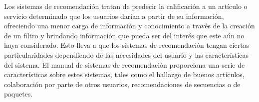 \documentclass[12pt,letterpaper,openany]{book}
\begin{document}
\vspace{5mm}\newline
Los sistemas de recomendación tratan de predecir la calificación a un artículo o servicio determinado que los usuarios darían a partir de su información, ofreciendo una menor carga de información y conocimiento a través de la creación de un filtro y brindando información que pueda ser del interés que este aún no haya considerado\cite{6}. Esto lleva a que los sistemas de recomendación tengan ciertas particularidades dependiendo de las necesidades del usuario y las características del sistema. El manual de sistemas de recomendación\cite{13} proporciona una serie de características sobre estos sistemas, tales como el hallazgo de buenos artículos, colaboración por parte de otros usuarios, recomendaciones de secuencias o de paquetes.
\end{document}
